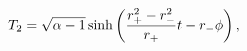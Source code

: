 \begin{equation}
T_2 = \sqrt{\alpha-1} \sinh\left( {r_+^2 - r_-^2 \over r_+} t - r_-
\phi \right),
\end{equation}

